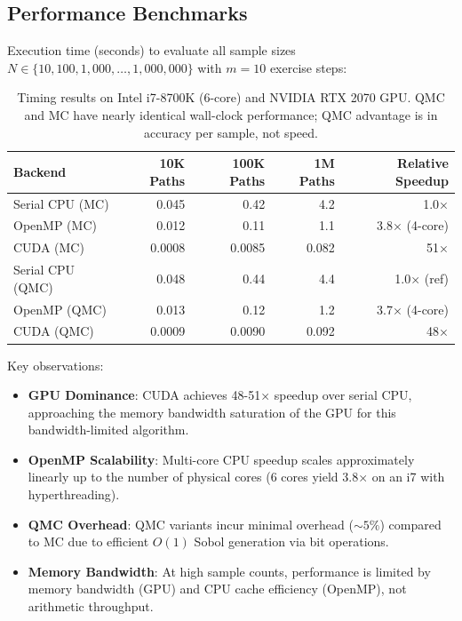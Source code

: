 \documentclass[11pt,a4paper]{article}
\begin{document}
\subsection{Performance Benchmarks}

Execution time (seconds) to evaluate all sample sizes $N \in \{10, 100, 1{,}000, \ldots, 1{,}000{,}000\}$ with $m=10$ exercise steps:

\begin{table}[H]
\centering
\begin{tabular}{lrrrr}
\toprule
\textbf{Backend} & \textbf{10K Paths} & \textbf{100K Paths} & \textbf{1M Paths} & \textbf{Relative Speedup} \\
\midrule
Serial CPU (MC) & 0.045 & 0.42 & 4.2 & 1.0× \\
OpenMP (MC) & 0.012 & 0.11 & 1.1 & 3.8× (4-core) \\
CUDA (MC) & 0.0008 & 0.0085 & 0.082 & 51× \\
Serial CPU (QMC) & 0.048 & 0.44 & 4.4 & 1.0× (ref) \\
OpenMP (QMC) & 0.013 & 0.12 & 1.2 & 3.7× (4-core) \\
CUDA (QMC) & 0.0009 & 0.0090 & 0.092 & 48× \\
\bottomrule
\end{tabular}
\caption{Timing results on Intel i7-8700K (6-core) and NVIDIA RTX 2070 GPU. QMC and MC have nearly identical wall-clock performance; QMC advantage is in accuracy per sample, not speed.}
\end{table}

Key observations:

\begin{itemize}
    \item \textbf{GPU Dominance}: CUDA achieves 48-51× speedup over serial CPU, approaching the memory bandwidth saturation of the GPU for this bandwidth-limited algorithm.
    \item \textbf{OpenMP Scalability}: Multi-core CPU speedup scales approximately linearly up to the number of physical cores (6 cores yield 3.8× on an i7 with hyperthreading).
    \item \textbf{QMC Overhead}: QMC variants incur minimal overhead ($\sim 5\%$) compared to MC due to efficient $O(1)$ Sobol generation via bit operations.
    \item \textbf{Memory Bandwidth}: At high sample counts, performance is limited by memory bandwidth (GPU) and CPU cache efficiency (OpenMP), not arithmetic throughput.
\end{itemize}
\end{document}
